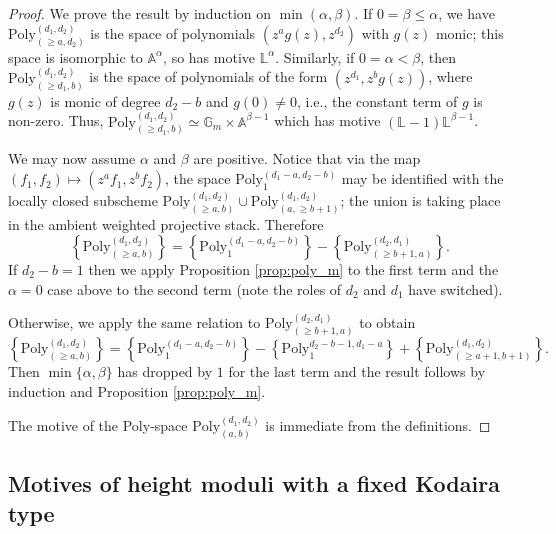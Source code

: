 \documentclass[a4paper,12pt]{amsart}
\theoremstyle{definition}
\newcommand{\bG}{\mathbb{G}}
\newcommand{\bA}{\mathbb{A}}
\newcommand{\Lb}{\mathbb{L}}
\begin{document}
	\begin{proof}
		We prove the result by induction on $\min(\alpha,\beta)$. If $0 = \beta \le \alpha$, we have $\mathrm{Poly}_{(\ge a,d_2)}^{(d_1, d_2)}$ is the space of polynomials $(z^ag(z),z^{d_2})$ with $g(z)$ monic; this space is isomorphic to $\bA^\alpha$, so has motive $
		\Lb^\alpha$. Similarly, if $0 = \alpha < \beta$, then $\mathrm{Poly}_{(\ge d_1,b)}^{(d_1, d_2)}$ is the space of polynomials of the form $(z^{d_1},z^bg(z))$, where $g(z)$ is monic of degree $d_2-b$ and $g(0)\neq0$, i.e., the constant term of $g$ is non-zero. Thus, $\mathrm{Poly}_{(\ge d_1,b)}^{(d_1, d_2)}\simeq\bG_m\times\bA^{\beta-1}$ which has motive $(\Lb-1)\Lb^{\beta-1}$. 
		
		We may now assume $\alpha$ and $\beta$ are positive. Notice that via the map $(f_1,f_2)\mapsto (z^af_1,z^bf_2)$, the space $\mathrm{Poly}_{1}^{(d_1-a, d_2-b)}$ may be identified with the locally closed subscheme $\mathrm{Poly}_{(\ge a,b)}^{(d_1, d_2)}\cup \mathrm{Poly}_{(a,\geq b+1)}^{(d_1, d_2)}$; the union is taking place in the ambient weighted projective stack. Therefore
		\[
		\left\{\mathrm{Poly}_{(\ge a,b)}^{(d_1, d_2)}\right\} =
		\left\{\mathrm{Poly}_{1}^{(d_1-a, d_2-b)}\right\} 
		-\left\{\mathrm{Poly}_{(\geq b+1,a)}^{(d_2, d_1)}\right\}.
		\]
		If $d_2 - b = 1$ then we apply Proposition \ref{prop:poly_m} to the first term and the $\alpha = 0$ case above to the second term (note the roles of $d_2$ and $d_1$ have switched). 
		
		Otherwise, we apply the same relation to $\mathrm{Poly}^{(d_2, d_1)}_{(\geq b + 1, a)}$ to obtain 
		\[
		\left\{\mathrm{Poly}_{(\ge a,b)}^{(d_1, d_2)}\right\} =
		\left\{\mathrm{Poly}_{1}^{(d_1-a, d_2-b)}\right\} 
		- \left\{\mathrm{Poly}_1^{d_2 - b - 1, d_1 -a}\right\} + \left\{\mathrm{Poly}_{(\geq a+1,b+1)}^{(d_1, d_2)}\right\}.
		\]
		Then $\min\{\alpha, \beta\}$ has dropped by $1$ for the last term and the result follows by induction and Proposition \ref{prop:poly_m}. 
		
		The motive of the Poly-space $\mathrm{Poly}_{(a,b)}^{(d_1, d_2)}$ is immediate from the definitions.
	\end{proof}
	
	
	
	
	\subsection{Motives of height moduli with a fixed Kodaira type}  \label{subsect:Mot_Kod_One}
	
\end{document}
